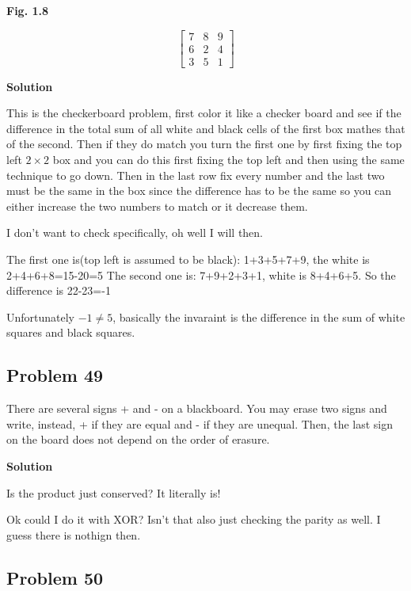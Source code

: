 \documentclass[12pt,tikz,border=10pt]{article}
\theoremstyle{definition}
\theoremstyle{remark}
\begin{document}
\begin{center}
    \textbf{Fig. 1.8}
    
    \[
    \begin{bmatrix}
        7 & 8 & 9 \\
        6 & 2 & 4 \\
        3 & 5 & 1
    \end{bmatrix}
    \]
\end{center}

\textbf{Solution}

This is the checkerboard problem, first color it like a checker board and see if the difference in the total sum of all 
white and black cells of the first box mathes that of the second. Then if they do match you turn the first one by first 
fixing the top left $2\times 2$ box and you can do this first fixing the top left and then using the same technique to go down.
Then in the last row fix every number and the last two must be the same in the box since the difference has to be the same so you can 
either increase the two numbers to match or it decrease them. 

I don't want to check specifically, oh well I will then.

The first one is(top left is assumed to be black): 1+3+5+7+9, the white is 2+4+6+8=15-20=5
The second one is: 7+9+2+3+1, white is 8+4+6+5. So the difference is 22-23=-1

Unfortunately $-1 \neq 5$, basically the invaraint is the difference in the sum of white squares and black squares.

\subsection{Problem 49}

There are several signs + and - on a blackboard. You may erase two signs and
write, instead, + if they are equal and - if they are unequal. Then, the last sign on
the board does not depend on the order of erasure.

\textbf{Solution}

Is the product just conserved? It literally is!

Ok could I do it with XOR? Isn't that also just checking the parity as well. I guess there is nothign then.

\subsection{Problem 50}
\end{document}
